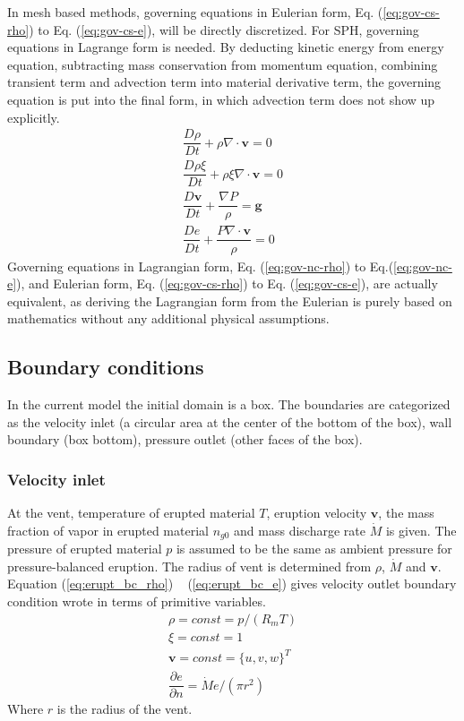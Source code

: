 \documentclass[journal abbreviation, manuscript]{copernicus}
\begin{document}
In mesh based methods, governing equations in Eulerian form, Eq. (\ref{eq:gov-cs-rho}) to Eq. (\ref{eq:gov-cs-e}), will be directly discretized. For SPH, governing equations in Lagrange form is needed. By deducting kinetic energy from energy equation, subtracting mass conservation from momentum equation, combining transient term and advection term into material derivative term, the governing equation is put into the final form, in which advection term does not show up explicitly.
\begin{align}
\dfrac{D \rho}{D t} + \rho \nabla \cdot \textbf{v} = 0 \label{eq:gov-nc-rho}\\
\dfrac{D \rho \xi}{D t} + \rho \xi \nabla \cdot \textbf{v} = 0 \label{eq:gov-nc-ks}\\
\dfrac{D \textbf{v}}{D t} + \dfrac{\nabla P}{\rho} =\textbf{g} \label{eq:gov-nc-v}\\
\dfrac{D e}{D t} + \dfrac{P \nabla \cdot \textbf{v}}{\rho} = 0 \label{eq:gov-nc-e}
\end{align}
Governing equations in Lagrangian form, Eq. (\ref{eq:gov-nc-rho}) to Eq.(\ref{eq:gov-nc-e}), and Eulerian form, Eq. (\ref{eq:gov-cs-rho}) to Eq. (\ref{eq:gov-cs-e}), are actually equivalent, as deriving the Lagrangian form from the Eulerian is purely based on mathematics without any additional physical assumptions.

\subsection{Boundary conditions}
In the current model the initial domain is a box. The boundaries are categorized as the velocity inlet (a circular area at the center of the bottom of the box), wall boundary (box bottom), pressure outlet (other faces of the box).

\subsubsection{Velocity inlet}
At the vent, temperature of erupted material $T$, eruption velocity $\textbf{v}$, the mass fraction of vapor in erupted material $n_{g0}$ and mass discharge rate $\dot M$ is given. The pressure of erupted material $p$ is assumed to be the same as ambient pressure for pressure-balanced eruption. The radius of vent is determined from $\rho$, $\dot M$ and $\textbf{v}$. Equation (\ref{eq:erupt_bc_rho}) ~ (\ref{eq:erupt_bc_e}) gives velocity outlet boundary condition wrote in terms of primitive variables.
\begin{align}
\rho =const = p/(R_m T) \label{eq:erupt_bc_rho} \\
\xi=const=1 \label{eq:erupt_bc_xi}\\
\textbf{v} = const =\{u,v,w\}^T \label{eq:erupt_bc_v}\\
\dfrac{\partial e}{\partial n}=\dot M e /(\pi r^2) \label{eq:erupt_bc_e}
\end{align} 
Where $r$ is the radius of the vent.
\end{document}
